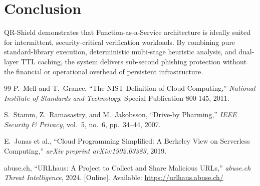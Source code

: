 \documentclass[12pt,a4paper]{report}
\begin{document}
\chapter{Conclusion}
QR-Shield demonstrates that Function-as-a-Service architecture is ideally suited for intermittent, security-critical verification workloads. By combining pure standard-library execution, deterministic multi-stage heuristic analysis, and dual-layer TTL caching, the system delivers sub-second phishing protection without the financial or operational overhead of persistent infrastructure.

\begin{thebibliography}{99}
P.~Mell and T.~Grance, ``The NIST Definition of Cloud Computing,'' \emph{National Institute of Standards and Technology}, Special Publication 800-145, 2011.

S.~Stamm, Z.~Ramasastry, and M.~Jakobsson, ``Drive-by Pharming,'' \emph{IEEE Security \& Privacy}, vol.~5, no.~6, pp.~34--44, 2007.

E.~Jonas et al., ``Cloud Programming Simplified: A Berkeley View on Serverless Computing,'' \emph{arXiv preprint arXiv:1902.03383}, 2019.

abuse.ch, ``URLhaus: A Project to Collect and Share Malicious URLs,'' \emph{abuse.ch Threat Intelligence}, 2024. [Online]. Available: \url{https://urlhaus.abuse.ch/}
\end{thebibliography}
\end{document}
